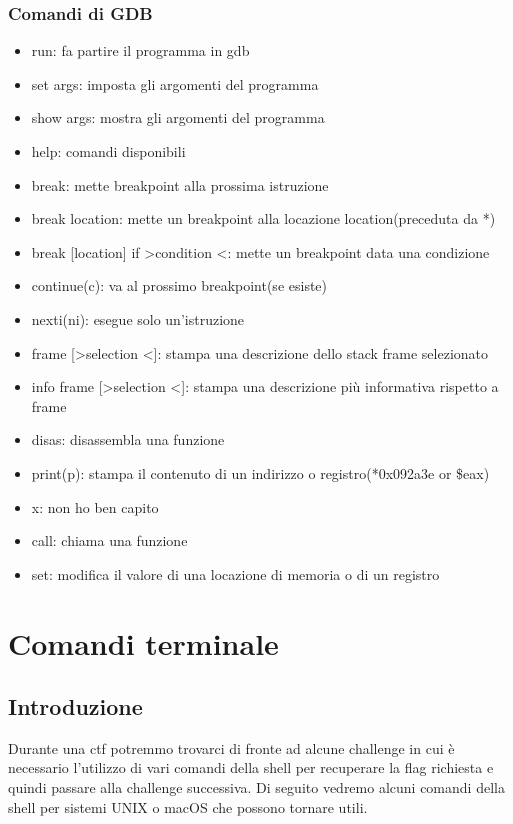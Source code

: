 \documentclass[oneside,a4paper,11pt]{book}
\theoremstyle{italicstyle}
\theoremstyle{normStyle}
\begin{document}
\subsection{Comandi di GDB}
\begin{itemize}
\item run: fa partire il programma in gdb
\item set args: imposta gli argomenti del programma
\item show args: mostra gli argomenti del programma
\item help: comandi disponibili
\item break: mette breakpoint alla prossima istruzione
\item break location: mette un breakpoint alla locazione location(preceduta da *)
\item break [location] if \textgreater condition \textless: mette un breakpoint data una condizione
\item continue(c): va al prossimo breakpoint(se esiste)
\item nexti(ni): esegue solo un'istruzione
\item frame [\textgreater selection \textless]: stampa una descrizione dello stack frame selezionato
\item info frame [\textgreater selection \textless]: stampa una descrizione più informativa rispetto a frame
\item disas: disassembla una funzione
\item print(p): stampa il contenuto di un indirizzo o registro(*0x092a3e or \$eax)  
\item x: non ho ben capito
\item call: chiama una funzione 
\item set: modifica il valore di una locazione di memoria o di un registro

\end{itemize}


\chapter{Comandi terminale}
\section{Introduzione}
Durante una ctf potremmo trovarci di fronte ad alcune challenge in cui è necessario l'utilizzo di vari comandi della shell per recuperare la flag richiesta e quindi passare alla challenge successiva.
Di seguito vedremo alcuni comandi della shell per sistemi UNIX o macOS che possono tornare utili.
\end{document}
